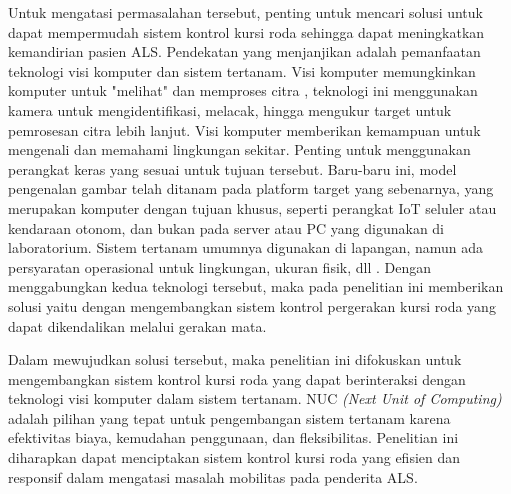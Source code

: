Untuk mengatasi permasalahan tersebut, penting untuk mencari solusi untuk dapat mempermudah sistem kontrol kursi roda sehingga dapat meningkatkan kemandirian pasien ALS. Pendekatan yang menjanjikan adalah pemanfaatan teknologi visi komputer dan sistem tertanam. Visi komputer memungkinkan komputer untuk "melihat" dan memproses citra \cite{TIAN20201}, teknologi ini menggunakan kamera untuk mengidentifikasi, melacak, hingga mengukur target untuk pemrosesan citra lebih lanjut. Visi komputer memberikan kemampuan untuk mengenali dan memahami lingkungan sekitar. Penting untuk menggunakan perangkat keras yang sesuai untuk tujuan tersebut. Baru-baru ini, model pengenalan gambar telah ditanam pada platform target yang sebenarnya, yang merupakan komputer dengan tujuan khusus, seperti perangkat IoT seluler atau kendaraan otonom, dan bukan pada server atau PC yang digunakan di laboratorium. Sistem tertanam umumnya digunakan di lapangan, namun ada persyaratan operasional untuk lingkungan, ukuran fisik, dll \cite{8939843}. Dengan menggabungkan kedua teknologi tersebut, maka pada penelitian ini memberikan solusi yaitu dengan mengembangkan sistem kontrol pergerakan kursi roda yang dapat dikendalikan melalui gerakan mata.

Dalam mewujudkan solusi tersebut, maka penelitian ini difokuskan untuk mengembangkan sistem kontrol kursi roda yang dapat berinteraksi dengan teknologi visi komputer dalam sistem tertanam. NUC \textit{(Next Unit of Computing)} adalah pilihan yang tepat untuk pengembangan sistem tertanam karena efektivitas biaya, kemudahan penggunaan, dan fleksibilitas. Penelitian ini diharapkan dapat menciptakan sistem kontrol kursi roda yang efisien dan responsif dalam mengatasi masalah mobilitas pada penderita ALS.